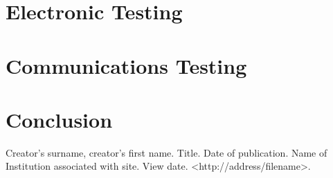 \documentclass[a4paper,11pt]{report}
\let\Oldsection\section
\renewcommand{\section}{\FloatBarrier\Oldsection}
\begin{document}
\chapter{Electronic Testing} \label{sec_Electro Testing}


\chapter{Communications Testing} \label{sec_Comms Testing}


\chapter{Conclusion}


\clearpage
\printbibliography[heading=bibintoc]
Creator’s surname, creator’s first name. Title. Date of
publication. Name of Institution associated with site. View date. <http://address/filename>.\\

\appendix
\addappheadtotoc
\graphicspath{{./Sections/PDFs/}}





\end{document}
